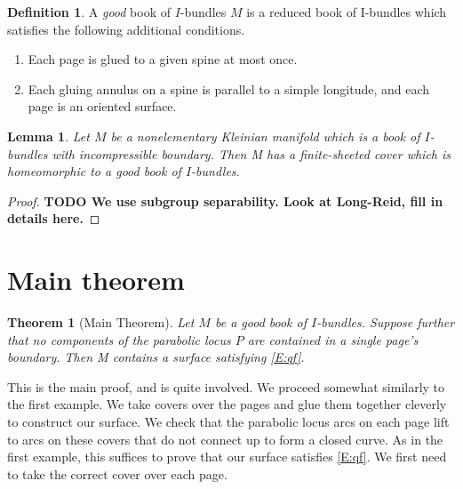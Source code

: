 \documentclass[12pt]{amsart}
\newtheorem{thm}[theorem]{Theorem}
\newtheorem{lemma}[theorem]{Lemma}
\theoremstyle{definition}
\newtheorem{defn}[theorem]{Definition}
\theoremstyle{remark}
\begin{document}
\begin{defn}

A \emph{good} book of $I$-bundles $M$ is a reduced book of I-bundles which
satisfies the following additional conditions.

\begin{enumerate}

\item Each page is glued to a given spine at most once.

\item Each gluing annulus on a spine is parallel to a simple longitude, and
each page is an oriented surface.

\end{enumerate}

\end{defn}

\begin{lemma}

Let $M$ be a nonelementary Kleinian manifold which is a book of $I$-bundles
with incompressible boundary. Then M has a finite-sheeted cover which is
homeomorphic to a good book of $I$-bundles.

\end{lemma}

\begin{proof}

\textbf{ TODO We use subgroup separability. Look at Long-Reid, fill in details
here.}

\end{proof}

\section{Main theorem}

\begin{thm}[Main Theorem]

Let $M$ be a good book of $I$-bundles.  Suppose further that no components of
the parabolic locus $P$ are contained in a single page's boundary. Then
M contains a surface satisfying \eqref{E:qf}.

\end{thm}

This is the main proof, and is quite involved. We proceed somewhat similarly to
the first example. We take covers over the pages and glue them together
cleverly to construct our surface. We check that the parabolic locus arcs on
each page lift to arcs on these covers that do not connect up to form a closed
curve. As in the first example, this suffices to prove that our surface
satisfies \eqref{E:qf}. We first need to take the correct cover over each page.
\end{document}
